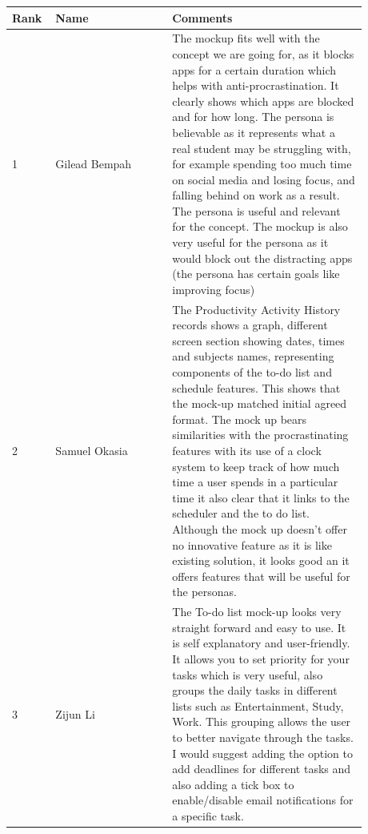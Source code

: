 \documentclass[a4paper]{article}
\begin{document}
{\noindent\begin{tabular}{|p{0.075\linewidth}|p{0.3\linewidth}|p{0.5\linewidth}|} 
	\hline
 \textbf{Rank} & \textbf{Name} & \textbf{Comments} \\
 \hline
 1 & Gilead Bempah						& The mockup fits well with the concept we are going for, as it blocks apps for a certain duration which helps with anti-procrastination. It clearly shows which apps are blocked and for how long. The persona is believable as it represents what a real student may be struggling with, for example spending too much time on social media and losing focus, and falling behind on work as a result. The persona is useful and relevant for the concept. The mockup is also very useful for the persona as it would block out the distracting apps (the persona has certain goals like improving focus)\\
 \hline
 2 & Samuel Okasia							& The Productivity Activity History records shows a graph, different screen section showing dates, times and subjects names, representing components of the to-do list and schedule features. This shows that the mock-up matched initial agreed format. The mock up bears similarities with the procrastinating features with its use of a clock system to keep track of how much time a user spends in a particular time it also clear that it links to the scheduler and the to do list. Although the mock up doesn’t offer no innovative feature as it is like existing solution, it looks good an it offers features that will be useful for the personas.\\
 \hline
 3 & Zijun Li									& The To-do list mock-up looks very straight forward and easy to use. It is self explanatory and user-friendly.  It allows you to set priority for your tasks which is very useful, also groups the daily tasks in different lists such as Entertainment, Study, Work. This grouping allows the user to better navigate through the tasks. I would suggest adding the option to add deadlines for different tasks and also adding a tick box to enable/disable email notifications for a specific task.\\
 \hline
\end{tabular}}

\newpage
\end{document}
